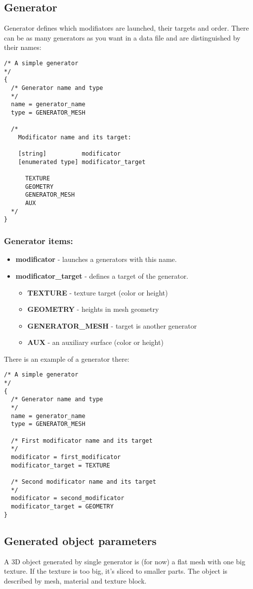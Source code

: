 \documentclass[9pt]{article}
\begin{document}
\subsection{Generator}
Generator defines which modifiators are launched, their targets and order. 
There can be as many generators as you want in a data file and 
are distinguished by their names:
\begin{verbatim}
/* A simple generator
*/
{
  /* Generator name and type
  */
  name = generator_name
  type = GENERATOR_MESH

  /*
    Modificator name and its target:
    
    [string]          modificator
    [enumerated type] modificator_target
      
      TEXTURE
      GEOMETRY
      GENERATOR_MESH
      AUX
  */
}
\end{verbatim}
\subsubsection*{Generator items:}
\begin{itemize}
\item{\bf modificator} - launches a generators with this name.
\item{\bf modificator\_target} - defines a target of the generator.
\begin{itemize}
\item{\bf TEXTURE} - texture target (color or height)
\item{\bf GEOMETRY} - heights in mesh geometry
\item{\bf GENERATOR\_MESH} - target is another generator
\item{\bf AUX} - an auxiliary surface (color or height)
\end{itemize}
\end{itemize}
There is an example of a generator there:
\begin{verbatim}
/* A simple generator
*/
{
  /* Generator name and type
  */
  name = generator_name
  type = GENERATOR_MESH
  
  /* First modificator name and its target
  */
  modificator = first_modificator
  modificator_target = TEXTURE
  
  /* Second modificator name and its target
  */
  modificator = second_modificator
  modificator_target = GEOMETRY
}
\end{verbatim}

\subsection{Generated object parameters}
A 3D object generated by single generator is (for now) a flat mesh with
one big texture. If the texture is too big, it's sliced to smaller parts.
The object is described by mesh, material and texture block.
\end{document}
